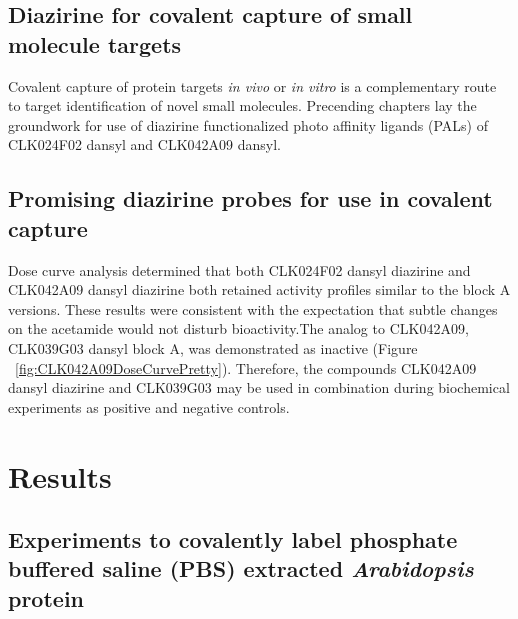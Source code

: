 \subsection{Diazirine for covalent capture of small molecule targets}

Covalent capture of protein targets {\it in vivo} or {\it in vitro} is a complementary route to target identification of novel small molecules. Precending chapters lay the groundwork for use of diazirine functionalized photo affinity ligands (PALs) of CLK024F02 dansyl and CLK042A09 dansyl.

\subsection{Promising diazirine probes for use in covalent capture}

Dose curve analysis determined that both CLK024F02 dansyl diazirine and CLK042A09 dansyl diazirine both retained activity profiles similar to the block A versions. These results were consistent with the expectation that subtle changes on the acetamide would not disturb bioactivity.The analog to CLK042A09, CLK039G03 dansyl block A, was demonstrated as inactive (Figure ~\ref{fig:CLK042A09DoseCurvePretty}). Therefore, the compounds CLK042A09 dansyl diazirine and CLK039G03 may be used in combination during biochemical experiments as positive and negative controls.


\section{Results}

\subsection{Experiments to covalently label phosphate buffered saline (PBS) extracted {\it Arabidopsis} protein}

